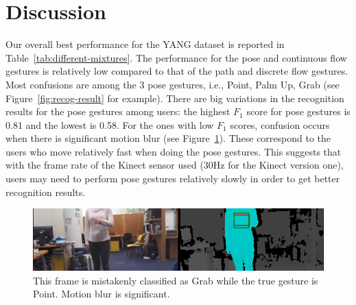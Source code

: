 \section{Discussion}
Our overall best performance for the YANG dataset is reported in
Table~\ref{tab:different-mixtures}. The performance for the pose and
continuous flow gestures is relatively low compared to that of the path and
discrete flow gestures. Most
confusions are among the 3 pose gestures, i.e., Point, Palm Up, Grab (see
Figure~\ref{fig:recog-result} for example).
There are big variations in the recognition results for the pose gestures among users: the highest $F_1$ score for pose gestures is 0.81
and the lowest is 0.58. For the ones with low $F_1$ scores, confusion occurs
when there is significant motion blur (see Figure~\ref{fig:point_grab}). These
correspond to the users who move relatively fast when doing the pose gestures.
This suggests that with the frame rate of the Kinect sensor used (30Hz for
the Kinect version one), users may need to perform pose gestures relatively
slowly in order to get better recognition results.

\begin{figure}[tbh]
\centering
\includegraphics[width=\linewidth]{figures/point_posture_full_image.png}
\caption{This frame is mistakenly classified as Grab while the true gesture
is Point. Motion blur is significant.}
\label{fig:point_grab}
\end{figure}